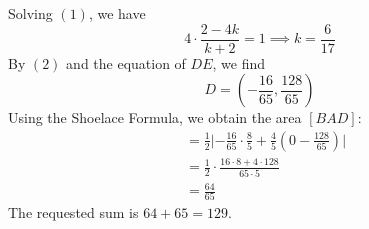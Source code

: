 \begin{enumerate}
Solving $(1)$, we have
 \[4\cdot\frac{2-4k}{k+2}=1\implies k=\frac{6}{17}\]By $(2)$ and the equation of $DE$, we find
 \[D=(-\frac{16}{65},\frac{128}{65})\]Using the Shoelace Formula, we obtain the area $[BAD]$:\begin{align*}[BAD]&=\frac{1}{2}\lvert -\frac{16}{65}\cdot\frac{8}{5}+\frac{4}{5}(0-\frac{128}{65}) \rvert\\[BAD]&=\frac{1}{2}\cdot\frac{16\cdot 8+4\cdot 128}{65\cdot 5}\\[BAD]&=\frac{64}{65}\end{align*}
The requested sum is $64+65=\boxed{129}$.

 


\end{enumerate}